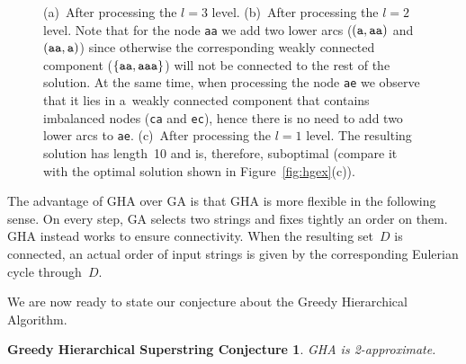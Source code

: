 \begin{figure}[!ht]
\begin{mypic}


\end{mypic}
\caption{(a)~After processing the $l=3$ level. (b)~After processing the $l=2$ level. Note that for the node {\tt aa} we add two lower arcs ($({\tt a}, {\tt aa})$ and $({\tt aa}, {\tt a})$) since otherwise the corresponding weakly connected component ($\{{\tt aa}, {\tt aaa}\}$) will not be connected to the rest of the solution. At the same time, when processing the node {\tt ae} we observe that it lies in a~weakly connected component that contains imbalanced nodes ({\tt ca} and {\tt ec}), hence there is no need to add two lower arcs to {\tt ae}. (c)~After processing the $l=1$ level. The resulting solution has length~10 and is, therefore, suboptimal (compare it with the optimal solution shown in Figure~\ref{fig:hgex}(c)).}
\label{fig:hgexa}
\end{figure}

The advantage of GHA over GA is that GHA is more flexible in the following sense. On every step, GA selects two strings and fixes tightly an order on them. GHA instead works to ensure connectivity. When the resulting set~$D$ is connected, an actual order of input strings is given by the corresponding Eulerian cycle through~$D$.

We are now ready to state our conjecture about the Greedy Hierarchical Algorithm.
\newtheorem*{ghcc}{Greedy Hierarchical Superstring Conjecture}
\begin{ghcc}
GHA is 2-approximate.
\end{ghcc}

